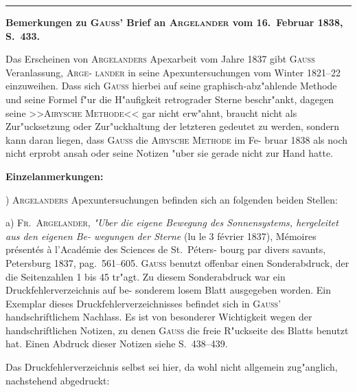 \documentclass[12pt,a4paper]{article}
\theoremstyle{plain}
\theoremstyle{definition}
\theoremstyle{remark}
\begin{document}
\vspace{0.5em}
\hrule
\vspace{0.5em}

\textbf{Bemerkungen zu \textsc{Gauss}' Brief an \textsc{Argelander} vom 16.~Februar 1838, S.~433.}

Das Erscheinen von \textsc{Argelanders} Apexarbeit vom Jahre 1837 gibt \textsc{Gauss} Veranlassung, \textsc{Arge}-
\textsc{lander} in seine Apexuntersuchungen vom Winter 1821--22 einzuweihen. Dass sich \textsc{Gauss} hierbei auf
seine graphisch-abz"ahlende Methode und seine Formel f"ur die H"aufigkeit retrograder Sterne beschr"ankt,
dagegen seine >>\textsc{Airysche Methode}<< gar nicht erw"ahnt, braucht nicht als Zur"ucksetzung oder Zur"uckhaltung
der letzteren gedeutet zu werden, sondern kann daran liegen, dass \textsc{Gauss} die \textsc{Airysche Methode} im Fe-
bruar 1838 als noch nicht erprobt ansah oder seine Notizen "uber sie gerade nicht zur Hand hatte.

\begin{center}\textbf{Einzelanmerkungen:}\end{center}

\smallskip{}) \textsc{Argelanders} Apexuntersuchungen befinden sich an folgenden beiden Stellen:

\quad a) \textsc{Fr.\ Argelander}, \textit{"Uber die eigene Bewegung des Sonnensystems, hergeleitet aus den eigenen Be-
wegungen der Sterne} (lu le 3 f\'evrier 1837), M\'emoires pr\'esent\'es \`a l'Acad\'emie des Sciences de St.\ P\'eters-
bourg par divers savants, Petersburg 1837, pag.~561--605. \textsc{Gauss} benutzt offenbar einen Sonderabdruck,
der die Seitenzahlen 1 bis 45 tr"agt. Zu diesem Sonderabdruck war ein Druckfehlerverzeichnis auf be-
sonderem losem Blatt ausgegeben worden. Ein Exemplar dieses Druckfehlerverzeichnisses befindet sich in
\textsc{Gauss}' handschriftlichem Nachlass. Es ist von besonderer Wichtigkeit wegen der handschriftlichen Notizen,
zu denen \textsc{Gauss} die freie R"uckseite des Blatts benutzt hat. Einen Abdruck dieser Notizen siehe S.~438--439.

\quad Das Druckfehlerverzeichnis selbst sei hier, da wohl nicht allgemein zug"anglich, nachstehend abgedruckt:
\end{document}
